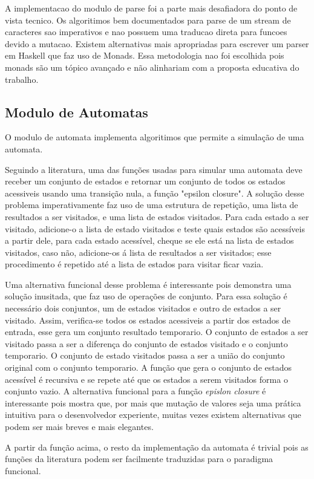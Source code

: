 A implementacao do modulo de parse foi a parte mais desafiadora do ponto de vista tecnico.
Os algoritimos bem documentados para parse de um stream de caracteres sao imperativos e nao possuem uma traducao direta para funcoes devido a mutacao.
Existem alternativas mais apropriadas para escrever um parser em Haskell que faz uso de Monads.
Essa metodologia nao foi escolhida pois monads são um tópico avançado e não alinhariam com a proposta educativa do trabalho.

\subsection{Modulo de Automatas}
O modulo de automata implementa algoritimos que permite a simulação de uma automata.

Seguindo a literatura, uma das funções usadas para simular uma automata deve receber um conjunto de estados e retornar um conjunto de todos os estados acessiveis usando uma transição nula, a função "epsilon closure".
A solução desse problema imperativamente faz uso de uma estrutura de repetição, uma lista de resultados a ser visitados, e uma lista de estados visitados.
Para cada estado a ser visitado, adicione-o a lista de estado visitados e teste quais estados são acessíveis a partir dele, para cada estado acessível, cheque se ele está na lista de estados visitados, caso não, adicione-os á lista de resultados a ser visitados; esse procedimento é repetido até a lista de estados para visitar ficar vazia.

Uma alternativa funcional desse problema é interessante pois demonstra uma solução inusitada, que faz uso de operações de conjunto.
Para essa solução é necessário dois conjuntos, um de estados visitados e outro de estados a ser visitado.
Assim, verifica-se todos os estados acessiveis a partir dos estados de entrada, esse gera um conjunto resultado temporario.
O conjunto de estados a ser visitado passa a ser a diferença do conjunto de estados visitado e o conjunto temporario.
O conjunto de estado visitados passa a ser a união do conjunto original com o conjunto temporario.
A função que gera o conjunto de estados acessível é recursiva e se repete até que os estados a serem visitados forma o conjunto vazio.
A alternativa funcional para a função \emph{epislon closure} é interessante pois mostra que, por mais que mutação de valores seja uma prática intuitiva para o desenvolvedor experiente, muitas vezes existem alternativas que podem ser mais breves e mais elegantes.

A partir da função acima, o resto da implementação da automata é trivial pois as funções da literatura podem ser facilmente traduzidas para o paradigma funcional.

